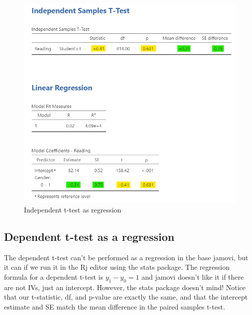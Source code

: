 \documentclass[
]{book}
\begin{document}
\begin{figure}

{\centering \includegraphics[width=1\linewidth]{images/14-regression-wrap-up/t-test} 

}

\caption{Independent t-test as regression}\label{fig:unnamed-chunk-2}
\end{figure}

\hypertarget{dependent-t-test-as-a-regression}{%
\subsection{Dependent t-test as a regression}\label{dependent-t-test-as-a-regression}}

The dependent t-test can't be performed as a regression in the base jamovi, but it can if we run it in the Rj editor using the stats package. The regression formula for a dependent t-test is \(y_1 -y_0 = 1\) and jamovi doesn't like it if there are not IVs, just an intercept. However, the stats package doesn't mind! Notice that our t-statistic, df, and p-value are exactly the same, and that the intercept estimate and SE match the mean difference in the paired samples t-test.
\end{document}
